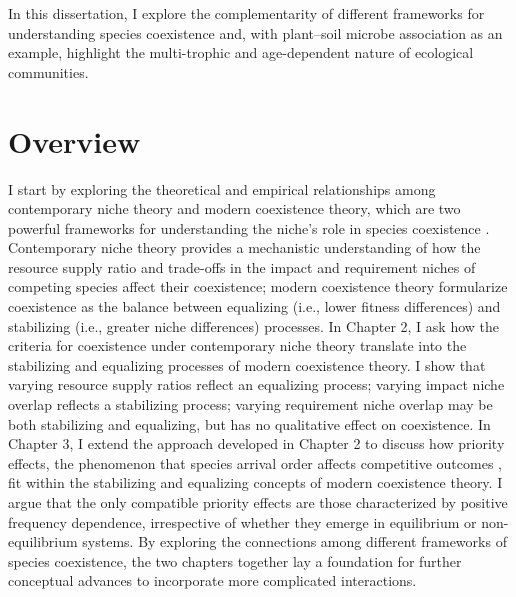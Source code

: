In this dissertation, I explore the complementarity of different frameworks for understanding species coexistence and, with plant--soil microbe association as an example, highlight the multi-trophic and age-dependent nature of ecological communities. 
\par



\section{Overview}
I start by exploring the theoretical and empirical relationships among contemporary niche theory and modern coexistence theory, which are two powerful frameworks for understanding the niche's role in species coexistence \citep{Chesson2000, Chase2003}. Contemporary niche theory provides a mechanistic understanding of how the resource supply ratio and trade-offs in the impact and requirement niches of competing species affect their coexistence; modern coexistence theory formularize coexistence as the balance between equalizing (i.e., lower fitness differences) and stabilizing (i.e., greater niche differences) processes. In Chapter 2, I ask how the criteria for coexistence under contemporary niche theory translate into the stabilizing and equalizing processes of modern coexistence theory. I show that varying resource supply ratios reflect an equalizing process; varying impact niche overlap reflects a stabilizing process; varying requirement niche overlap may be both stabilizing and equalizing, but has no qualitative effect on coexistence.
In Chapter 3, I extend the approach developed in Chapter 2 to discuss how priority effects, the phenomenon that species arrival order affects competitive outcomes \citep{Fukami2015}, fit within the stabilizing and equalizing concepts of modern coexistence theory. I argue that the only compatible priority effects are those characterized by positive frequency dependence, irrespective of whether they emerge in equilibrium or non-equilibrium systems.
By exploring the connections among different frameworks of species coexistence, the two chapters together lay a foundation for further conceptual advances to incorporate more complicated interactions.
\par


